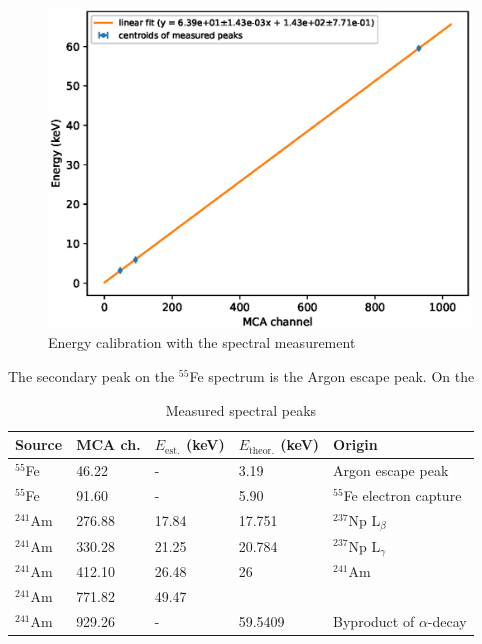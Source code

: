\documentclass[a4paper]{article}
\begin{document}
\begin{figure}[ht!]
\centering
\includegraphics[width=\textwidth]{fig/python/spectral_calibration.eps}
\caption{Energy calibration with the spectral measurement}
\label{fig:spectral_calibration}
\end{figure}

\FloatBarrier
The secondary peak on the $^{55}$Fe spectrum is the Argon escape peak.
On the 

\begin{table}[ht!]
\centering
\caption{Measured spectral peaks}
\begin{tabular}{lllll}
Source	& MCA ch.	& $E_\text{est.}$ (keV)	& $E_\text{theor.}$ (keV)	& Origin \\
\hline
$^{55}$Fe	& 46.22			& -			& 3.19 			& Argon escape peak \cite{winkler_gaseous_2015} \\
$^{55}$Fe	& 91.60			& -			& 5.90 			& $^{55}$Fe electron capture \cite{winkler_gaseous_2015} \\
$^{241}$Am	& 276.88			& 17.84		& 17.751			& $^{237}$Np L$_\beta$ \cites{maeda_peak_2015}{am241_spectrum} \\
$^{241}$Am	& 330.28			& 21.25		& 20.784			& $^{237}$Np L$_\gamma$ \cites{maeda_peak_2015}{am241_spectrum} \\
$^{241}$Am	& 412.10			& 26.48		& 26			& $^{241}$Am \cite{am241_spectrum} \\
$^{241}$Am	& 771.82			& 49.47		&				& \\
$^{241}$Am	& 929.26			& -			& 59.5409		& Byproduct of $\alpha$-decay \cite{winkler_gaseous_2015} \\
\end{tabular}
\end{table}
\end{document}
